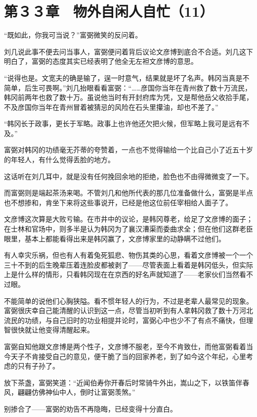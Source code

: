 \section{第３３章　物外自闲人自忙（11）}

“既如此，你我可当说？”富弼微笑的反问着。

刘几说此事不便去问当事人，富弼便问着背后议论文彦博到底合不合适。刘几这下明白了，富弼的态度其实已经表明了他全无左袒文彦博的意思。

“说得也是。文宽夫的确是输了，逞一时意气，结果就是坏了名声。韩冈当真是不简单，后生可畏啊。”刘几抬眼看看富弼：“……彦国你当年在青州救了数十万流民，韩冈前两年也救了数十万。虽说他当时有开封府库为凭，又是帮他岳父收拾手尾，不及彦国你当年在青州冒着被猜忌的风险在石头里攥油，却也不差了。”

“韩冈长于政事，更长于军略。政事上也许他还欠把火候，但军略上我可是远有不及。”

富弼对韩冈的功绩毫无芥蒂的夸赞着，一点也不觉得输给一个比自己小了近五十岁的年轻人，有什么觉得丢脸的地方。

这话听在刘几耳中，就是没有任何挽回余地的拒绝，脸色也不由得微微变了一下。

而富弼则是端起茶汤来喝。不管刘几和他所代表的那几位准备做什么，富弼是半点也不想掺和，肯坐下来将这些事说开，已经是他这位前任宰相给人面子了。

文彦博这次算是大败亏输。在市井中的议论，是韩冈尊老，给足了文彦博的面子；在士林和官场中，则多半是认为韩冈为了襄汉漕渠而委曲求全；但在他们这群老臣眼里，基本上都能看得出来是韩冈赢了，文彦博家里的动静瞒不过他们。

有人幸灾乐祸，但也有人有着兔死狐悲、物伤其类的心思，看着文彦博被一个一个三十不到的后生晚辈压着连脸皮都被剥了——尽管表面上看着是韩冈低头，但实际上是什么样的情形，只看韩冈现在在京西的好名声就知道了——老家伙们当然看不过眼。

不能简单的说他们心胸狭隘。看不惯年轻人的行为，不过是老辈人最常见的现象。富弼很庆幸自己能清醒的认识到这一点，尽管当初听到有人拿韩冈救了数十万河北流民的功绩，与自己旧时的功业相提并论时，富弼心中也少不了有点不痛快，但理智很快就让他变得清醒起来。

富弼自知他跟文彦博是两个性子，文彦博不服老，至今不肯致仕，而他富弼看着当今天子不肯接受自己的意见，便干脆了当的回家养老，到了如今这个年纪，心里考虑的只有子孙了。

放下茶盏，富弼笑道：“近闻伯寿你开春后时常骑牛外出，嵩山之下，以铁笛伴春风，翩翩仿佛神仙中人，倒时让富弼羡煞。”

别掺合了——富弼的劝告不再隐晦，已经变得十分直白。

